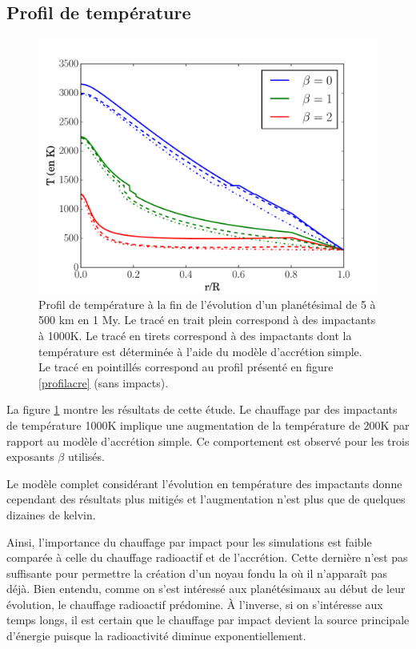 \documentclass[10pt,a4paper]{article}
\numberwithin{equation}{section}
\begin{document}
\label{impactant}
\subsection{Profil de température}

\begin{figure}[h]
    \centering	    
	\includegraphics[scale=0.45]{figures/impact2.pdf}
    \caption{Profil de température à la fin de l'évolution d'un planétésimal de 5 à 500 km en 1 My. Le tracé en trait plein correspond à des impactants à 1000K. Le tracé en tirets correspond à des impactants dont la température est déterminée à l'aide du modèle d'accrétion simple.  Le tracé en pointillés correspond au profil présenté en figure \ref{profilacre} (sans impacts).}
    	\label{impact} 
\end{figure}

La figure \ref{impact} montre les résultats de cette étude. Le chauffage par des impactants de température 1000K implique une augmentation de la température de 200K par rapport au modèle d'accrétion simple. Ce comportement est observé pour les trois exposants $\beta$ utilisés.
\medskip

Le modèle complet considérant l'évolution en température des impactants donne cependant des résultats plus mitigés et l'augmentation n'est plus que de quelques dizaines de kelvin.
\medskip

Ainsi, l'importance du chauffage par impact pour les simulations est faible comparée à celle du chauffage radioactif et de l'accrétion. Cette dernière n'est pas suffisante pour permettre la création d'un noyau fondu la où il n'apparaît pas déjà. Bien entendu, comme on s'est intéressé aux planétésimaux au début de leur évolution, le chauffage radioactif prédomine. À l'inverse, si on s'intéresse aux temps longs, il est certain que le chauffage par impact devient la source principale d'énergie puisque la radioactivité diminue exponentiellement. 
\end{document}
